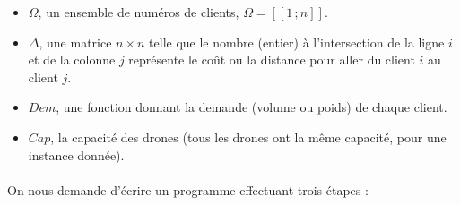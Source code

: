 \documentclass[a4paper,10pt]{article}
\newcommand{\segm}[1]{[\![1\,;#1]\!]}
\begin{document}
\begin{itemize}

\item $\Omega$, un ensemble de numéros de clients, $\Omega = \segm{n}$. 

\item $\Delta$, une matrice $n\times n$ telle que le nombre (entier) à l'intersection de la ligne $i$ et de la colonne $j$ représente le coût ou la distance pour aller du client $i$ au client $j$.

\item $Dem$, une fonction donnant la demande (volume ou poids) de chaque client.

\item $Cap$, la capacité des drones (tous les drones ont la même capacité, pour une instance donnée).

\end{itemize}

\paragraph{}
On nous demande d'écrire un programme effectuant trois étapes :
\end{document}

